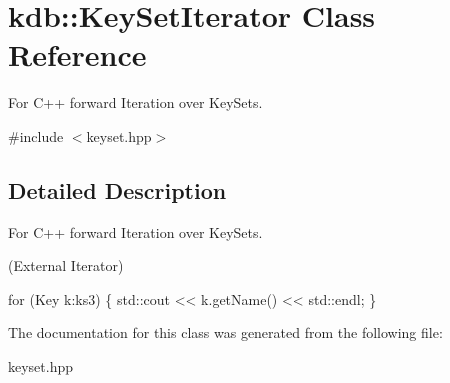 \hypertarget{classkdb_1_1KeySetIterator}{\section{kdb\-:\-:Key\-Set\-Iterator Class Reference}
\label{classkdb_1_1KeySetIterator}
}


For C++ forward Iteration over Key\-Sets.  




{\ttfamily \#include $<$keyset.\-hpp$>$}



\subsection{Detailed Description}
For C++ forward Iteration over Key\-Sets. 

(External Iterator) 
\begin{DoxyCode}
\textcolor{keywordflow}{for} (Key k:ks3)
\{
   std::cout << k.getName() << std::endl;
\}
\end{DoxyCode}
 

The documentation for this class was generated from the following file\-:\begin{DoxyCompactItemize}
\item 
keyset.\-hpp\end{DoxyCompactItemize}

